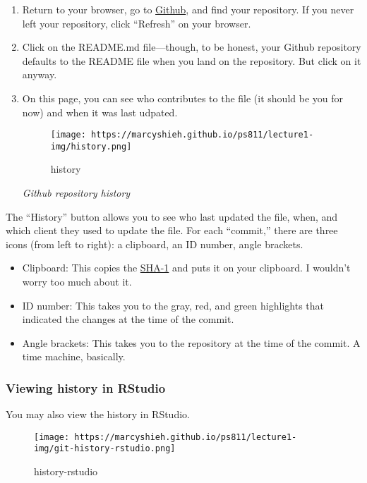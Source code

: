 \documentclass[
]{book}
\providecommand{\tightlist}{%
  \setlength{\itemsep}{0pt}\setlength{\parskip}{0pt}}
\begin{document}
\begin{enumerate}
\def\labelenumi{\arabic{enumi}.}
\setcounter{enumi}{12}
\item
  Return to your browser, go to \href{https://github.com}{Github}, and find your repository. If you never left your repository, click ``Refresh'' on your browser.
\item
  Click on the README.md file---though, to be honest, your Github repository defaults to the README file when you land on the repository. But click on it anyway.
\item
  On this page, you can see who contributes to the file (it should be you for now) and when it was last udpated.

  \begin{figure}
  \centering
  \texttt{[image: https://marcyshieh.github.io/ps811/lecture1-img/history.png]}
  \caption{history}
  \end{figure}

  \emph{Github repository history}
\end{enumerate}

The ``History'' button allows you to see who last updated the file, when, and which client they used to update the file. For each ``commit,'' there are three icons (from left to right): a clipboard, an ID number, angle brackets.

\begin{itemize}
\tightlist
\item
  Clipboard: This copies the \href{https://en.wikipedia.org/wiki/SHA-1}{SHA-1} and puts it on your clipboard. I wouldn't worry too much about it.
\item
  ID number: This takes you to the gray, red, and green highlights that indicated the changes at the time of the commit.
\item
  Angle brackets: This takes you to the repository at the time of the commit. A time machine, basically.
\end{itemize}

\hypertarget{viewing-history-in-rstudio}{%
\subsubsection{Viewing history in RStudio}\label{viewing-history-in-rstudio}}

You may also view the history in RStudio.

\begin{figure}
\centering
\texttt{[image: https://marcyshieh.github.io/ps811/lecture1-img/git-history-rstudio.png]}
\caption{history-rstudio}
\end{figure}
\end{document}
